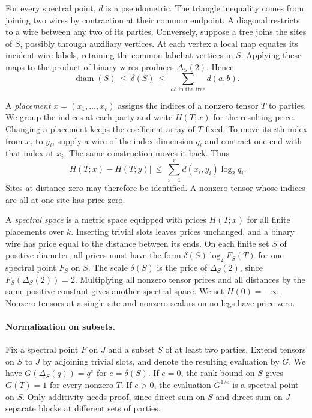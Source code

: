 For every spectral point, $d$ is a pseudometric. The triangle inequality
comes from joining two wires by contraction at their common endpoint.
A diagonal restricts to a wire between any two of its parties. Conversely,
suppose a tree joins the sites of $S$, possibly through auxiliary vertices.
At each vertex a local map equates its incident wire labels, retaining the
common label at vertices in $S$. Applying these maps to the product of
binary wires produces $\Delta_S(2)$. Hence
\begin{equation}\label{eq:span-price}
 \operatorname{diam}(S)\ \le\ \delta(S)\ \le\
 \sum_{ab\text{ in the tree}} d(a,b).
\end{equation}

A \emph{placement} $x=(x_1,\ldots,x_r)$ assigns the indices of a nonzero
tensor $T$ to parties. We group the indices at each party and write $H(T;x)$ for the
resulting price. Changing a placement keeps the coefficient array of $T$
fixed. To move its $i$th index from $x_i$ to $y_i$, supply a wire of the
index dimension $q_i$ and contract one end with that index at $x_i$.
The same construction moves it back. Thus
\begin{equation}\label{eq:move}
 |H(T;x)-H(T;y)|\ \le\ \sum_{i=1}^r d(x_i,y_i)\log_2 q_i .
\end{equation}
Sites at distance zero may therefore be identified. A nonzero tensor
whose indices are all at one site has price zero.

A \emph{spectral space} is a metric space equipped with prices $H(T;x)$
for all finite placements over $k$. Inserting trivial slots leaves prices
unchanged, and a binary wire has price equal to the distance between its
ends. On each finite set $S$ of positive diameter, all prices must have
the form $\delta(S)\log_2 F_S(T)$ for one spectral point $F_S$ on $S$.
The scale $\delta(S)$ is the price of $\Delta_S(2)$, since
$F_S(\Delta_S(2))=2$. Multiplying all nonzero tensor prices and all
distances by the same positive constant gives another spectral space.
We set $H(0)=-\infty$. Nonzero tensors at a single site and nonzero
scalars on no legs have price zero.

\paragraph{Normalization on subsets.}
Fix a spectral point $F$ on $J$ and a subset $S$ of at least two parties.
Extend tensors on $S$ to $J$ by adjoining trivial slots, and denote the
resulting evaluation by $G$. We have $G(\Delta_S(q))=q^e$ for
$e=\delta(S)$. If $e=0$, the rank bound on $S$ gives $G(T)=1$ for
every nonzero $T$. If $e>0$, the evaluation $G^{1/e}$ is a spectral
point on $S$. Only additivity needs proof, since direct sum on $S$ and
direct sum on $J$ separate blocks at different sets of parties.

